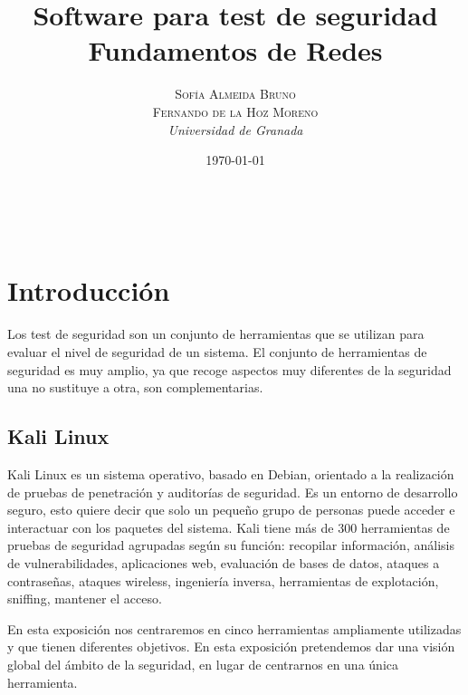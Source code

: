 \documentclass[a4paper, 11pt]{article}
\title{\textbf{Software para test de seguridad}\\ %
Fundamentos de Redes} %
\author{\textsc{Sofía Almeida Bruno\\Fernando de la Hoz Moreno} %
\\{\textit{Universidad de Granada}}} %
\date{\today} %
\makeatletter
\theoremstyle{plain}
\renewcommand{\maketitle}{
  \begin{flushright} %
  
  {\LARGE\@title} %
  
  \vspace{50pt} %
  
  {\large\@author} %
  \\\@date %
  \vspace{40pt} %
  \end{flushright}
}
\makeatother
\begin{document}
\maketitle %
\newpage
\tableofcontents
\newpage

\section{Introducción}

Los test de seguridad son un conjunto de herramientas que se utilizan para evaluar el nivel de seguridad de un sistema. El conjunto de herramientas de seguridad es muy amplio, ya que recoge aspectos muy diferentes de la seguridad una no sustituye a otra, son complementarias.

\subsection{Kali Linux}

Kali Linux es un sistema operativo, basado en Debian, orientado a la realización de pruebas de penetración y auditorías de seguridad. Es un entorno de desarrollo seguro, esto quiere decir que solo un pequeño grupo de personas puede acceder e interactuar con los paquetes del sistema. Kali tiene más de 300 herramientas de pruebas de seguridad agrupadas según su función: recopilar información, análisis de vulnerabilidades, aplicaciones web, evaluación de bases de datos, ataques a contraseñas, ataques wireless, ingeniería inversa, herramientas de explotación, sniffing, mantener el acceso.

En esta exposición nos centraremos en cinco herramientas ampliamente utilizadas y que tienen diferentes objetivos. En esta exposición pretendemos dar una visión global del ámbito de la seguridad, en lugar de centrarnos en una única herramienta.
\end{document}
